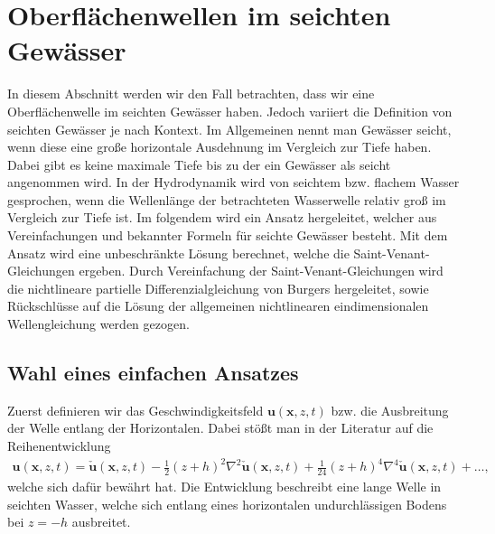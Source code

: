 %
%
%
%
\section{Oberflächenwellen im seichten Gewässer
\label{luke:section:SeichtenGewaesser}}

In diesem Abschnitt werden wir den Fall betrachten, dass wir eine Oberflächenwelle im seichten Gewässer haben. 
%
Jedoch variiert die Definition von seichten Gewässer je nach Kontext. 
Im Allgemeinen nennt man Gewässer seicht, wenn diese eine große horizontale Ausdehnung im Vergleich zur Tiefe haben. 
Dabei gibt es keine maximale Tiefe bis zu der ein Gewässer als seicht angenommen wird.
In der Hydrodynamik wird von seichtem bzw. flachem Wasser gesprochen, wenn die Wellenlänge der betrachteten Wasserwelle relativ groß im Vergleich zur Tiefe ist.
%
Im folgendem wird ein Ansatz hergeleitet, welcher aus Vereinfachungen und bekannter Formeln für seichte Gewässer besteht.
Mit dem Ansatz wird eine unbeschränkte Lösung berechnet, welche die Saint-Venant-Gleichungen ergeben.
%
Durch Vereinfachung der Saint-Venant-Gleichungen wird die nichtlineare partielle Differenzialgleichung von Burgers hergeleitet, sowie Rückschlüsse auf die Lösung der allgemeinen nichtlinearen eindimensionalen Wellengleichung werden gezogen. 

\subsection{Wahl eines einfachen Ansatzes}
Zuerst definieren wir das Geschwindigkeitsfeld $\bm{u}(\bm{x},z,t)$ bzw. die Ausbreitung der Welle entlang der Horizontalen.
Dabei stößt man in der Literatur auf die Reihenentwicklung
\begin{align}
	\bm{u}(\bm{x},z,t) = \check{\bm{u}}(\bm{x},z,t) - \frac{1}{2} (z + h)^2 \nabla^2 \check{\bm{u}}(\bm{x},z,t) + \frac{1}{24} (z + h)^4 \nabla^4 \check{\bm{u}}(\bm{x},z,t) + \ldots,
\end{align}
welche sich dafür bewährt hat.
Die Entwicklung beschreibt eine lange Welle in seichten Wasser, welche sich entlang eines horizontalen undurchlässigen Bodens bei $z = -h$ ausbreitet.

